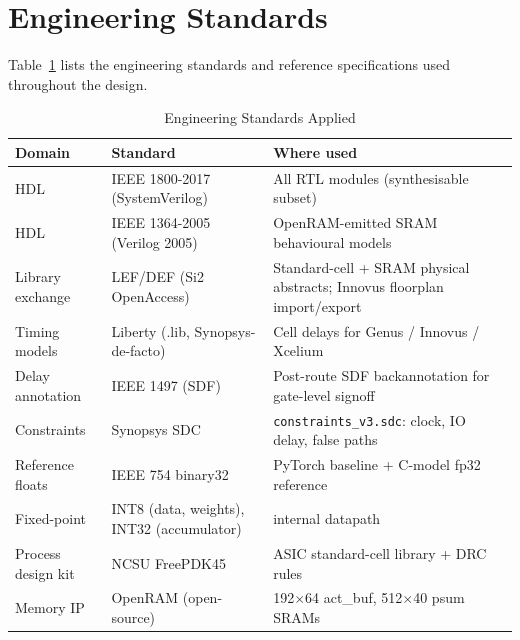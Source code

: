 \section{Engineering Standards}
\label{sec:standards}

Table~\ref{tab:standards} lists the engineering standards and reference specifications used throughout the design.

\begin{table}[H]
\centering
\caption{Engineering Standards Applied}
\label{tab:standards}
\begin{tabularx}{\textwidth}{l l X}
\toprule
\headrow \textbf{Domain} & \textbf{Standard} & \textbf{Where used} \\
\midrule
HDL                & IEEE 1800-2017 (SystemVerilog)         & All RTL modules (synthesisable subset) \\
HDL                & IEEE 1364-2005 (Verilog 2005)          & OpenRAM-emitted SRAM behavioural models \\
Library exchange   & LEF/DEF (Si2 OpenAccess)               & Standard-cell + SRAM physical abstracts; Innovus floorplan import/export \\
Timing models      & Liberty (.lib, Synopsys-de-facto)      & Cell delays for Genus / Innovus / Xcelium \\
Delay annotation   & IEEE 1497 (SDF)                        & Post-route SDF backannotation for gate-level signoff \\
Constraints        & Synopsys SDC                           & \texttt{constraints\_v3.sdc}: clock, IO delay, false paths \\
Reference floats   & IEEE 754 binary32                      & PyTorch baseline + C-model fp32 reference \\
Fixed-point        & INT8 (data, weights), INT32 (accumulator)  & internal datapath \\
Process design kit & NCSU FreePDK45                         & ASIC standard-cell library + DRC rules \\
Memory IP          & OpenRAM (open-source)                  & 192$\times$64 act\_buf, 512$\times$40 psum SRAMs \\
\bottomrule
\end{tabularx}
\end{table}

